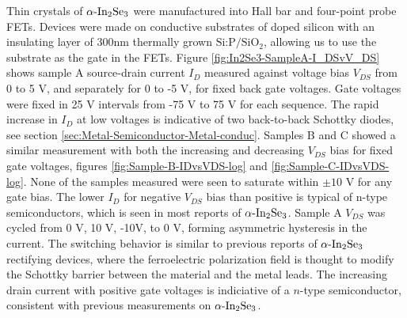 Thin crystals of $\textrm{\ensuremath{\alpha}-In}_{2}\textrm{Se}_{3}$
were manufactured into Hall bar and four-point probe FETs. Devices
were made on conductive substrates of doped silicon with an insulating
layer of 300nm thermally grown $\textrm{Si:P/Si}\textrm{O}_{2}$,
allowing us to use the substrate as the gate in the FETs. Figure \ref{fig:In2Se3-SampleA-I_DSvV_DS}
shows sample A source-drain current $I_{D}$ measured against voltage
bias $V_{DS}$ from 0 to 5 V, and separately for 0 to -5 V, for fixed
back gate voltages. Gate voltages were fixed in 25 V intervals from
-75 V to 75 V for each sequence. The rapid increase in $I_{D}$ at
low voltages is indicative of two back-to-back Schottky diodes, see
section \ref{sec:Metal-Semiconductor-Metal-conduc}. Samples B and
C showed a similar measurement with both the increasing and decreasing
$V_{DS}$ bias for fixed gate voltages, figures \ref{fig:Sample-B-IDvsVDS-log}
and \ref{fig:Sample-C-IDvsVDS-log}. None of the samples measured
were seen to saturate within $\pm10$ V for any gate bias. The lower
$I_{D}$ for negative $V_{DS}$ bias than positive is typical of n-type
semiconductors, which is seen in most reports of $\textrm{\ensuremath{\alpha}-In}_{2}\textrm{Se}_{3}$\citep{island2015gatecontrolled,1986electrical}.
Sample A $V_{DS}$ was cycled from 0 V, 10 V, -10V, to 0 V, forming
asymmetric hysteresis in the current. The switching behavior is similar
to previous reports of $\textrm{\ensuremath{\alpha}-In}_{2}\textrm{Se}_{3}$
rectifying devices, where the ferroelectric polarization field is
thought to modify the Schottky barrier between the material and the
metal leads.\citep{yang2019nonvolatile,wan2018roomtemperature,cui2018intercorrelated,dai2020intrinsic}
The increasing drain current with positive gate voltages is indiciative
of a $n$-type semiconductor\citep{horowitz2015art}, consistent with
previous measurements on $\textrm{\ensuremath{\alpha}-In}_{2}\textrm{Se}_{3}$\citep{julien1986electrical,island2015gatecontrolled}.

